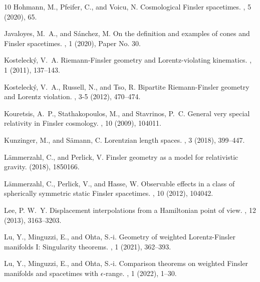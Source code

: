 \documentclass[a4paper,11pt]{article}
\numberwithin{equation}{section}
\theoremstyle{definition}
\theoremstyle{plain}
\begin{document}
\begin{thebibliography}{10}
	{\sc Hohmann, M., Pfeifer, C., and Voicu, N.}
	\newblock Cosmological {Finsler} spacetimes.
	, 5 (2020), 65.
	
	{\sc Javaloyes, M.~A., and S\'{a}nchez, M.}
	\newblock On the definition and examples of cones and {F}insler spacetimes.
	, 1 (2020), Paper No. 30.
	
	{\sc Kosteleck\'{y}, V.~A.}
	\newblock Riemann-{F}insler geometry and {L}orentz-violating kinematics.
	, 1 (2011), 137--143.
	
	{\sc Kosteleck\'{y}, V.~A., Russell, N., and Tso, R.}
	\newblock Bipartite {R}iemann-{F}insler geometry and {L}orentz violation.
	, 3-5 (2012), 470--474.
	
	{\sc Kouretsis, A.~P., Stathakopoulos, M., and Stavrinos, P.~C.}
	\newblock General very special relativity in {F}insler cosmology.
	, 10 (2009), 104011.
	
	{\sc Kunzinger, M., and S\"{a}mann, C.}
	\newblock Lorentzian length spaces.
	, 3 (2018), 399--447.
	
	{\sc L\"{a}mmerzahl, C., and Perlick, V.}
	\newblock Finsler geometry as a model for relativistic gravity.
	 (2018), 1850166.
	
	{\sc L{\"a}mmerzahl, C., Perlick, V., and Hasse, W.}
	\newblock Observable effects in a class of spherically symmetric static
	{F}insler spacetimes.
	, 10 (2012), 104042.
	
	{\sc Lee, P. W.~Y.}
	\newblock Displacement interpolations from a {H}amiltonian point of view.
	, 12 (2013), 3163--3203.
	
	{\sc Lu, Y., Minguzzi, E., and Ohta, S.-i.}
	\newblock Geometry of weighted {L}orentz-{F}insler manifolds {I}: {S}ingularity
	theorems.
	, 1 (2021), 362--393.
	
	{\sc Lu, Y., Minguzzi, E., and Ohta, S.-i.}
	\newblock Comparison theorems on weighted {F}insler manifolds and spacetimes
	with {$\epsilon$}-range.
	, 1 (2022), 1--30.
	

\end{thebibliography}
\end{document}
